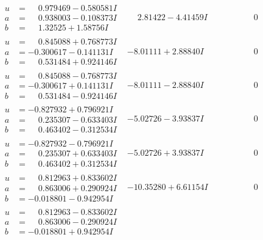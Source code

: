 \documentclass[1p]{elsarticle_modified}
\theoremstyle{definition}
\begin{document}
$$\begin{array}{c|c|c}
\begin{aligned}
u &= \phantom{-}0.979469 - 0.580581 I \\
a &= \phantom{-}0.938003 - 0.108373 I \\
b &= \phantom{-}1.32525 + 1.58756 I\end{aligned}
 & \phantom{-}2.81422 - 4.41459 I & \phantom{-0.000000 } 0 \\ \hline\begin{aligned}
u &= \phantom{-}0.845088 + 0.768773 I \\
a &= -0.300617 - 0.141131 I \\
b &= \phantom{-}0.531484 + 0.924146 I\end{aligned}
 & -8.01111 + 2.88840 I & \phantom{-0.000000 } 0 \\ \hline\begin{aligned}
u &= \phantom{-}0.845088 - 0.768773 I \\
a &= -0.300617 + 0.141131 I \\
b &= \phantom{-}0.531484 - 0.924146 I\end{aligned}
 & -8.01111 - 2.88840 I & \phantom{-0.000000 } 0 \\ \hline\begin{aligned}
u &= -0.827932 + 0.796921 I \\
a &= \phantom{-}0.235307 - 0.633403 I \\
b &= \phantom{-}0.463402 - 0.312534 I\end{aligned}
 & -5.02726 - 3.93837 I & \phantom{-0.000000 } 0 \\ \hline\begin{aligned}
u &= -0.827932 - 0.796921 I \\
a &= \phantom{-}0.235307 + 0.633403 I \\
b &= \phantom{-}0.463402 + 0.312534 I\end{aligned}
 & -5.02726 + 3.93837 I & \phantom{-0.000000 } 0 \\ \hline\begin{aligned}
u &= \phantom{-}0.812963 + 0.833602 I \\
a &= \phantom{-}0.863006 + 0.290924 I \\
b &= -0.018801 - 0.942954 I\end{aligned}
 & -10.35280 + 6.61154 I & \phantom{-0.000000 } 0 \\ \hline\begin{aligned}
u &= \phantom{-}0.812963 - 0.833602 I \\
a &= \phantom{-}0.863006 - 0.290924 I \\
b &= -0.018801 + 0.942954 I\end{aligned}

\end{array}$$
\end{document}
